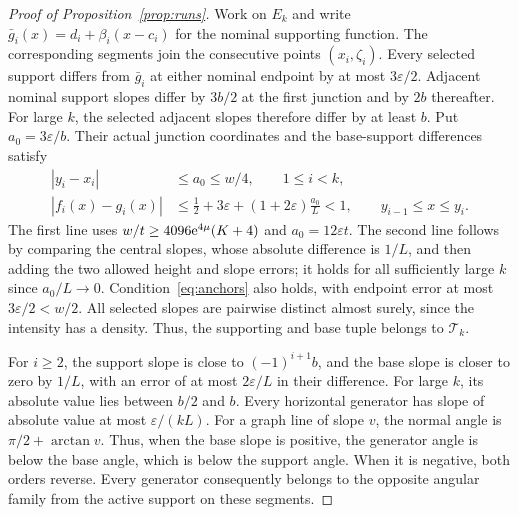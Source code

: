 \documentclass[11pt,letterpaper]{article}
\begin{document}
\begin{proof}[Proof of Proposition~\ref{prop:runs}]
Work on $E_k$ and write $\bar g_i(x)=d_i+\beta_i(x-c_i)$ for the nominal supporting function. The corresponding segments join the consecutive points $(x_i,\zeta_i)$. Every selected support differs from $\bar g_i$ at either nominal endpoint by at most $3\varepsilon/2$. Adjacent nominal support slopes differ by $3b/2$ at the first junction and by $2b$ thereafter. For large $k$, the selected adjacent slopes therefore differ by at least $b$. Put $a_0=3\varepsilon/b$. Their actual junction coordinates and the base-support differences satisfy
\begin{equation}\label{eq:admissible}
\begin{aligned}
 |y_i-x_i|&\le a_0\le w/4,\qquad 1\le i<k,\\
 |f_i(x)-g_i(x)|
 &\le\frac12+3\varepsilon+(1+2\varepsilon)\frac{a_0}{L}<1,
                 \qquad y_{i-1}\le x\le y_i.
\end{aligned}
\end{equation}
The first line uses $w/t\ge4096\mathrm{e}^{4\mu}(K+4)$ and $a_0=12\varepsilon t$. The second line follows by comparing the central slopes, whose absolute difference is $1/L$, and then adding the two allowed height and slope errors; it holds for all sufficiently large $k$ since $a_0/L\to0$. Condition~\eqref{eq:anchors} also holds, with endpoint error at most $3\varepsilon/2<w/2$. All selected slopes are pairwise distinct almost surely, since the intensity has a density. Thus, the supporting and base tuple belongs to $\mathcal T_k$.

For $i\ge2$, the support slope is close to $(-1)^{i+1}b$, and the base slope is closer to zero by $1/L$, with an error of at most $2\varepsilon/L$ in their difference. For large $k$, its absolute value lies between $b/2$ and $b$. Every horizontal generator has slope of absolute value at most $\varepsilon/(kL)$. For a graph line of slope $v$, the normal angle is $\pi/2+\arctan v$. Thus, when the base slope is positive, the generator angle is below the base angle, which is below the support angle. When it is negative, both orders reverse. Every generator consequently belongs to the opposite angular family from the active support on these segments.


\end{proof}
\end{document}
